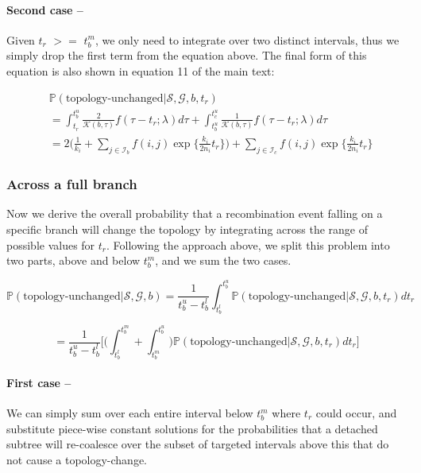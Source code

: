 \documentclass[11pt]{article}
\begin{document}
\paragraph{Second case --} Given $t_r$ $>=$ $t_b^m$, we only need to integrate over
two distinct intervals, thus we simply drop the first term from the equation above.
The final form of this equation is also shown in equation 11 of the main text:

\begin{equation}
\begin{aligned}
	&\mathbb{P}(\text{topology-unchanged} | \mathcal{S}, \mathcal{G}, b, t_r) \\
	&= \int_{t_r}^{t_b^u} \frac{2}{\mathcal{K}(b,\tau)} f(\tau - t_r; \lambda) d\tau + 
	 \int_{t_b^u}^{t_c^u} \frac{1}{\mathcal{K}(b, \tau)} f(\tau - t_r; \lambda) d\tau \\
	&= 2 \bigg(
		\frac{1}{k_i} + 
		\sum_{j \in \mathcal{I}_b} f(i,j) \exp \bigg\{ \frac{k_i}{2n_i} t_r \bigg\}
	\bigg) + 
	\sum_{j \in \mathcal{I}_c} f(i,j) \exp \bigg\{ \frac{k_i}{2n_i} t_r \bigg\}
\end{aligned}
\end{equation}

\subsubsection{Across a full branch}

Now we derive the overall probability that a recombination event falling on a specific branch will 
change the topology by integrating across the range of possible values for $t_r$.
Following the approach above, we split this problem into two parts, above and below
$t_b^m$, and we sum the two cases.

\begin{equation}
	\mathbb{P}(\text{topology-unchanged} | \mathcal{S}, \mathcal{G}, b) = 
	\frac{1}{t_b^u - t_b^l} \int_{t_b^l}^{t_b^u}
	\mathbb{P}(\text{topology-unchanged} | \mathcal{S}, \mathcal{G},b, t_r) dt_r
\end{equation}

\begin{equation}
	= \frac{1}{t_b^u - t_b^l}
	\bigg[
		\bigg(
			\int_{t_b^l}^{t_b^m} + 
			\int_{t_b^m}^{t_b^u}
		\bigg)
		\mathbb{P}(\text{topology-unchanged} | \mathcal{S}, \mathcal{G},b, t_r) dt_r
	\bigg]
\end{equation}


\paragraph{First case --}
We can simply sum over each entire interval below $t_b^m$ where $t_r$ could occur, and 
substitute piece-wise constant solutions for the probabilities that a detached
subtree will re-coalesce over the subset of targeted intervals above this that
do not cause a topology-change.
\end{document}
